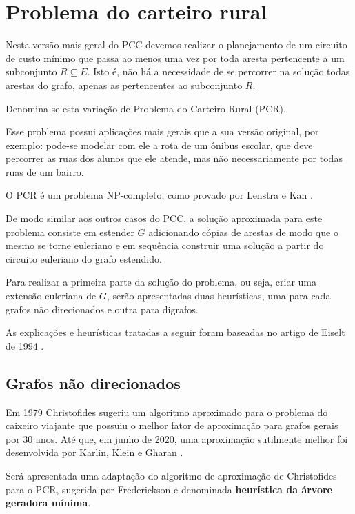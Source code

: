     \section{Problema do carteiro rural}
    
    Nesta versão mais geral do PCC devemos realizar o planejamento de um circuito de custo mínimo que passa ao menos uma vez por toda aresta pertencente a um subconjunto $R \subseteq E$. 
    Isto é, não há a necessidade de se percorrer na solução todas arestas do grafo, apenas as pertencentes ao subconjunto $R$.

    Denomina-se esta variação de Problema do Carteiro Rural (PCR).

    Esse problema possui aplicações mais gerais que a sua versão original, por exemplo: pode-se modelar com ele a rota de um ônibus escolar, que deve percorrer as ruas dos alunos que ele atende, mas não necessariamente por todas ruas de um bairro.

    O PCR é um problema NP-completo, como provado por Lenstra e Kan \cite{rural-np-complete}. 

    De modo similar aos outros casos do PCC, a solução aproximada para este problema consiste em estender $G$ adicionando cópias de arestas de modo que o mesmo se torne euleriano e em sequência construir uma solução a partir do circuito euleriano do grafo estendido.

    Para realizar a primeira parte da solução do problema, ou seja, criar uma extensão euleriana de $G$, serão apresentadas duas heurísticas, uma para cada grafos não direcionados e outra para digrafos.

    As explicações e heurísticas tratadas a seguir foram baseadas no artigo de Eiselt de 1994 \cite{michel}.

        \subsection{Grafos não direcionados}

        Em 1979 Christofides \cite{wiki-christofides} sugeriu um algoritmo aproximado para o problema do caixeiro viajante que possuiu o melhor fator de aproximação para grafos gerais por 30 anos.
        Até que, em junho de 2020, uma aproximação sutilmente melhor foi desenvolvida por Karlin, Klein e Gharan \cite{klein-tsp}.

        Será apresentada uma adaptação do algoritmo de aproximação de Christofides para o PCR, sugerida por Frederickson \cite{frederickson} e denominada \textbf{heurística da árvore geradora mínima}.

